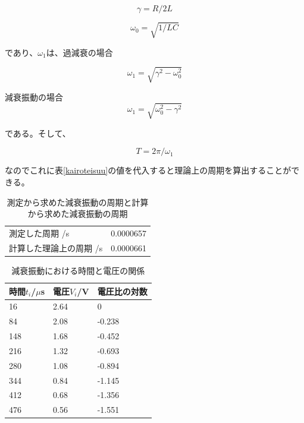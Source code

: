 \documentclass{jsarticle}
\begin{document}
    \begin{equation}
    \label{gamma}
        \gamma = R/2L
    \end{equation}
        
    \begin{equation}
    \label{omega0}
        \omega_0 = \sqrt{1/LC}
    \end{equation}
    
であり、$\omega_1$は、過減衰の場合

\begin{equation}
\label{omega1-1}
    \omega_1 = \sqrt{\gamma^2 - \omega_0^2}
\end{equation}


減衰振動の場合
\begin{equation}
\label{omega1-2}
    \omega_1 = \sqrt{\omega_0^2 - \gamma^2}
\end{equation}

である。そして、

\begin{equation}
\label{T}
    T = 2\pi/\omega_1
\end{equation}


なのでこれに表\ref{kairoteisuu}の値を代入すると理論上の周期を算出することができる。

\begin{table}[H]
    \centering
    \caption{測定から求めた減衰振動の周期と計算から求めた減衰振動の周期}
    \label{my-label}
    \begin{tabular}{|l|l|}
    測定した周期 /s    & 0.0000657 \\
    計算した理論上の周期  /s & 0.0000661
    \end{tabular}
    \end{table}

\begin{table}[H]
\centering
\caption{減衰振動における時間と電圧の関係}
\label{gensuisindouniokerujikan}
\begin{tabular}{lll}
\hline
時間$t_i$/$\mu$s & 電圧$V_i$/V & 電圧比の対数 \\ \hline
16     & 2.64   & 0      \\
84     & 2.08   & -0.238 \\
148    & 1.68   & -0.452 \\
216    & 1.32   & -0.693 \\
280    & 1.08   & -0.894 \\
344    & 0.84   & -1.145 \\
412    & 0.68   & -1.356 \\
476    & 0.56   & -1.551
\end{tabular}
\end{table}
\end{document}
